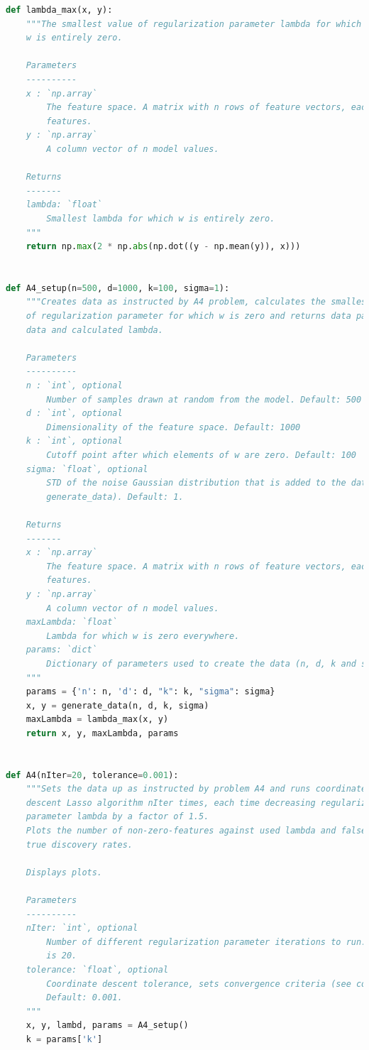 \documentclass{article}
\newcommand{\1}{\mathbf{1}}
\begin{document}
\begin{enumerate}
\begin{lstlisting}[language=Python]
def lambda_max(x, y):
    """The smallest value of regularization parameter lambda for which the
    w is entirely zero.

    Parameters
    ----------
    x : `np.array`
        The feature space. A matrix with n rows of feature vectors, each with d
        features.
    y : `np.array`
        A column vector of n model values.

    Returns
    -------
    lambda: `float`
        Smallest lambda for which w is entirely zero.
    """
    return np.max(2 * np.abs(np.dot((y - np.mean(y)), x)))


def A4_setup(n=500, d=1000, k=100, sigma=1):
    """Creates data as instructed by A4 problem, calculates the smallest value
    of regularization parameter for which w is zero and returns data parameters,
    data and calculated lambda.

    Parameters
    ----------
    n : `int`, optional
        Number of samples drawn at random from the model. Default: 500
    d : `int`, optional
        Dimensionality of the feature space. Default: 1000
    k : `int`, optional
        Cutoff point after which elements of w are zero. Default: 100
    sigma: `float`, optional
        STD of the noise Gaussian distribution that is added to the data (see
        generate_data). Default: 1.

    Returns
    -------
    x : `np.array`
        The feature space. A matrix with n rows of feature vectors, each with d
        features.
    y : `np.array`
        A column vector of n model values.
    maxLambda: `float`
        Lambda for which w is zero everywhere.
    params: `dict`
        Dictionary of parameters used to create the data (n, d, k and sigma).
    """
    params = {'n': n, 'd': d, "k": k, "sigma": sigma}
    x, y = generate_data(n, d, k, sigma)
    maxLambda = lambda_max(x, y)
    return x, y, maxLambda, params


def A4(nIter=20, tolerance=0.001):
    """Sets the data up as instructed by problem A4 and runs coordinate
    descent Lasso algorithm nIter times, each time decreasing regularization
    parameter lambda by a factor of 1.5.
    Plots the number of non-zero-features against used lambda and false vs
    true discovery rates.

    Displays plots.

    Parameters
    ----------
    nIter: `int`, optional
        Number of different regularization parameter iterations to run. Default
        is 20.
    tolerance: `float`, optional
        Coordinate descent tolerance, sets convergence criteria (see coordinate_descent).
        Default: 0.001.
    """
    x, y, lambd, params = A4_setup()
    k = params['k']


\end{lstlisting}
\end{enumerate}
\end{document}
